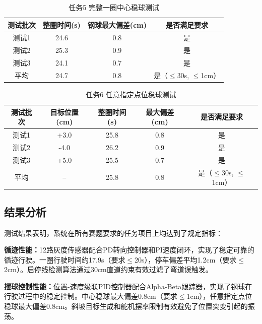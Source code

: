 \documentclass[12pt,a4paper]{ctexart}
\begin{document}
\begin{table}[H]
    \centering
    \footnotesize
    \caption{任务5 完整一圈中心稳球测试}
    \label{tab:test_task5}
    \begin{tabular}{|c|c|c|c|}
        \hline
        测试批次 & 整圈时间(s) & 钢球最大偏差(cm) & 是否满足要求 \\
        \hline
        测试1 & 24.6 & 0.8 & 是 \\
        \hline
        测试2 & 25.3 & 0.9 & 是 \\
        \hline
        测试3 & 24.1 & 0.7 & 是 \\
        \hline
        平均 & 24.7 & 0.8 & 是（$\leq$30s, $\leq$1cm） \\
        \hline
    \end{tabular}
\end{table}

\begin{table}[H]
    \centering
    \footnotesize
    \caption{任务6 任意指定点位稳球测试}
    \label{tab:test_task6}
    \begin{tabular}{|c|c|c|c|c|}
        \hline
        测试批次 & 目标位置(cm) & 整圈时间(s) & 最大偏差(cm) & 是否满足要求 \\
        \hline
        测试1 & +3.0 & 25.8 & 0.8 & 是 \\
        \hline
        测试2 & -4.0 & 26.2 & 0.9 & 是 \\
        \hline
        测试3 & +5.0 & 25.5 & 0.7 & 是 \\
        \hline
        平均 & -- & 25.8 & 0.8 & 是（$\leq$30s, $\leq$1cm） \\
        \hline
    \end{tabular}
\end{table}

\subsection{\textbf{结果分析}}

测试结果表明，系统在所有赛题要求的任务项目上均达到了规定指标：

\textbf{循迹性能：}12路灰度传感器配合PD转向控制器和PI速度闭环，实现了稳定可靠的循迹行驶。一圈行驶时间约17.9s（要求$\leq$20s），停车偏差平均1.2cm（要求$\leq$2cm）。启停线检测算法通过30cm直道约束有效过滤了弯道误触发。

\textbf{摆球控制性能：}位置-速度级联PID控制器配合Alpha-Beta跟踪器，实现了钢球在行驶过程中的稳定控制。中心稳球最大偏差0.8cm（要求$\leq$1cm），任意指定点位稳球最大偏差0.8cm。斜坡目标生成和舵机摆率限制有效避免了位置突变引起的振荡。
\end{document}
